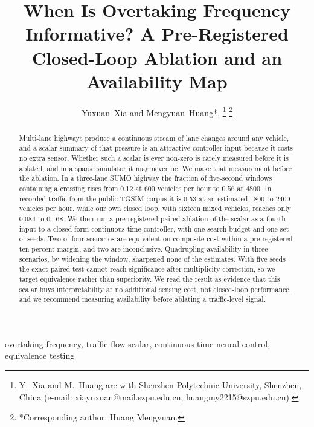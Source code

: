 \documentclass[journal]{IEEEtran}
\begin{document}
\title{When Is Overtaking Frequency Informative? A Pre-Registered\\ Closed-Loop Ablation and an Availability Map}

\author{Yuxuan~Xia and Mengyuan~Huang*,%
\thanks{Y.~Xia and M.~Huang are with Shenzhen Polytechnic University, Shenzhen, China
(e-mail: xiayuxuan@mail.szpu.edu.cn; huangmy2215@szpu.edu.cn).}
\thanks{*Corresponding author: Huang Mengyuan.}}

\maketitle

\begin{abstract}
Multi-lane highways produce a continuous stream of lane changes around any vehicle, and a scalar summary
of that pressure is an attractive controller input because it costs no extra sensor. Whether such a
scalar is ever non-zero is rarely measured before it is ablated, and in a sparse simulator it may never
be. We make that measurement before the ablation. In a three-lane SUMO highway the fraction of five-second windows
containing a crossing rises from 0.12 at 600 vehicles per hour to 0.56 at 4800. In recorded traffic from
the public TGSIM corpus it is 0.53 at an estimated 1800 to 2400 vehicles per hour, while our own closed
loop, with sixteen mixed vehicles, reaches only 0.084 to 0.168. We then run a pre-registered paired ablation of
the scalar as a fourth input to a closed-form continuous-time controller, with one search budget and one
set of seeds. Two of four scenarios are equivalent on composite cost within a pre-registered ten percent
margin, and two are inconclusive. Quadrupling availability in three scenarios, by widening the window,
sharpened none of the estimates. With five seeds the exact paired test cannot reach significance after
multiplicity correction, so we target equivalence rather than superiority. We read the result as
evidence that this scalar buys interpretability at no additional sensing cost, not closed-loop
performance, and we recommend measuring availability before ablating a traffic-level signal.
\end{abstract}

\begin{IEEEkeywords}
overtaking frequency, traffic-flow scalar, continuous-time neural control, equivalence testing
\end{IEEEkeywords}
\end{document}
